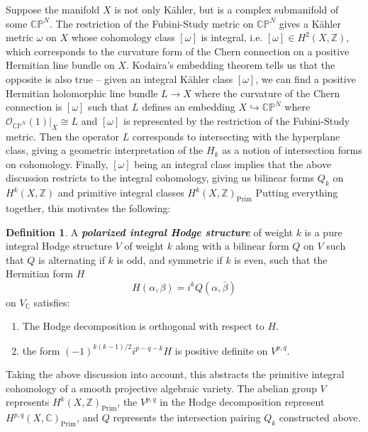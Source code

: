 \documentclass[psamsfonts, 12pt]{amsart}
\theoremstyle{definition}
\newtheorem{defn}[thm]{Definition}
\theoremstyle{remark}
\renewcommand{\O}{\mathcal{O}}
\newcommand{\ib}[1]{\textbf{\textit{#1}}}
\newcommand{\Z}{\mathbb{Z}}
\newcommand{\C}{\mathbb{C}}
\newcommand{\CP}{\mathbb{CP}}
\begin{document}
Suppose the manifold $X$ is not only K\"ahler, but is a complex submanifold
of some $\CP^N$. The restriction of the Fubini-Study metric on $\CP^N$ gives a
K\"ahler metric $\omega$ on $X$ whose cohomology class $[\omega]$ is integral, i.e.
$[\omega] \in H^2(X,\Z)$, which corresponds to the curvature form of the Chern
connection on a positive Hermitian line bundle on $X$. Kodaira's embedding theorem
tells us that the opposite is also true -- given an integral K\"ahler class $[\omega]$,
we can find a positive Hermitian holomorphic line bundle $L \to X$ where the curvature
of the Chern connection is $[\omega]$ such that $L$ defines an embedding
$X \hookrightarrow \CP^N$ where $\O_{\CP^N}(1)\vert_X \cong L$ and
$[\omega]$ is represented by the restriction of the Fubini-Study metric.
Then the operator $L$ corresponds to intersecting with the hyperplane class, giving
a geometric interpretation of the $H_k$ as a notion of intersection forms on
cohomology. Finally, $[\omega]$ being an integral class implies that the above
discussion restricts to the integral cohomology, giving us bilinear forms
$Q_k$ on $H^k(X,\Z)$ and primitive integral classes $H^k(X,\Z)_{\mathrm{Prim}}$
Putting everything together, this motivates the following:
%
\begin{defn}
A \ib{polarized integral Hodge structure} of weight $k$ is a pure integral
Hodge structure $V$ of weight $k$ along with a bilinear form $Q$ on $V$ such that
$Q$ is alternating if $k$ is odd, and symmetric if $k$ is even, such that
the Hermitian form $H$
\[
H(\alpha,\beta) = i^kQ(\alpha,\bar{\beta})
\]
on $V_\C$ satisfies:
\begin{enumerate}
  \item The Hodge decomposition is orthogonal with respect to $H$.
  \item the form $(-1)^{k(k-1)/2}i^{p-q-k}H$ is positive definite on $V^{p,q}$.
\end{enumerate}
\end{defn}
%
Taking the above discussion into account, this abstracts the primitive
integral cohomology of a smooth projective algebraic variety. The abelian
group $V$ represents $H^k(X,\Z)_{\mathrm{Prim}}$, the $V^{p,q}$ in the Hodge
decomposition represent $H^{p,q}(X,\C)_{\mathrm{Prim}}$, and $Q$
represents the intersection pairing $Q_k$ constructed above.
%
\end{document}
